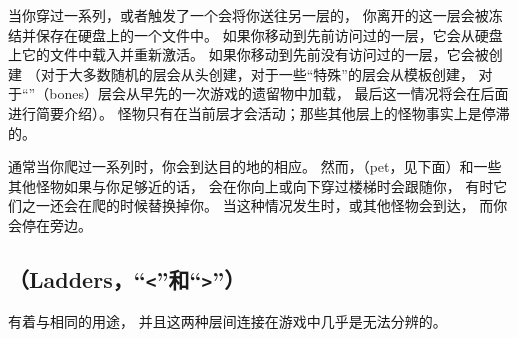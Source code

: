 \documentclass[a4paper, 10pt]{article}
\begin{document}
当你穿过一系列\zhTransStairs，或者触发了一个会将你送往另一层的\zhTransTraps，
你离开的这一层会被冻结并保存在硬盘上的一个文件中。
如果你移动到先前访问过的一层，它会从硬盘上它的文件中载入并重新激活。
如果你移动到先前没有访问过的一层，它会被创建
（对于大多数随机的层会从头创建，对于一些“特殊”的层会从模板创建，
对于“\zhTransBones”（bones）层会从早先的一次游戏的遗留物中加载，
最后这一情况将会在后面进行简要介绍）。
怪物只有在当前层才会活动；那些其他层上的怪物事实上是停滞的。
 
通常当你爬过一系列\zhTransStairs{}时，你会到达目的地的相应\zhTransStairs。
然而，\zhTransPets（pet，见下面）和一些其他怪物如果与你足够近的话，
会在你向上或向下穿过楼梯时会跟随你，
有时它们之一还会在爬的时候替换掉你。
当这种情况发生时，\zhTransPets{}或其他怪物会到达\zhTransStairs，
而你会停在旁边。

\subsection*{\zhTransLadders（Ladders，“{\tt <}”和“{\tt >}”）}

\zhTransLadders{}有着与\zhTransStairs{}相同的用途，
并且这两种层间连接在游戏中几乎是无法分辨的。
\end{document}
